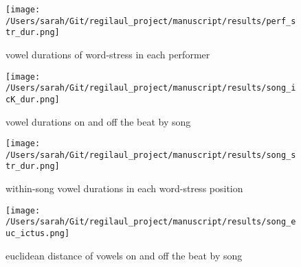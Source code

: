 \begin{figure}[htb]
\centering
\texttt{[image: /Users/sarah/Git/regilaul\_project/manuscript/results/perf\_str\_dur.png]}

\caption{vowel durations of word-stress in each performer}
\label{perfstr}
\end{figure}




\begin{figure}[htb]
\centering
\texttt{[image: /Users/sarah/Git/regilaul\_project/manuscript/results/song\_icK\_dur.png]}

\caption{vowel durations on and off the beat by song}
\label{sonicdur}

\end{figure}





\begin{figure}[htb]
\centering
\texttt{[image: /Users/sarah/Git/regilaul\_project/manuscript/results/song\_str\_dur.png]}

\caption{within-song vowel durations in each word-stress position}
\label{sonstrdur}

\end{figure}



\begin{figure}[htb]
\centering
\texttt{[image: /Users/sarah/Git/regilaul\_project/manuscript/results/song\_euc\_ictus.png]}
\caption{euclidean distance of vowels on and off the beat by song}
\label{eucicksong}

\end{figure}